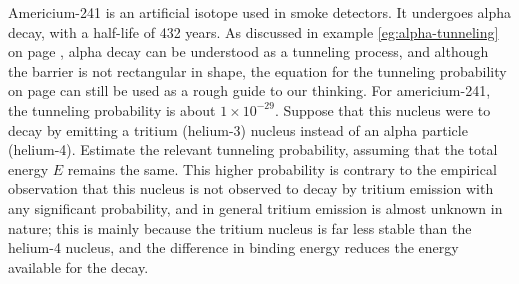 Americium-241 is an artificial isotope used in smoke detectors. It undergoes alpha decay, with a half-life of 432 years.
As discussed in example \ref{eg:alpha-tunneling} on page \pageref{eg:alpha-tunneling}, alpha decay can be understood
as a tunneling process, and although the barrier is not rectangular in shape, the equation for the tunneling
probability on page \pageref{tunneling-probability} can still be used as a rough guide to our thinking.
For americium-241, the tunneling probability is about $1\times10^{-29}$. %
Suppose that this nucleus were to decay by emitting a tritium (helium-3) nucleus instead of an alpha particle (helium-4).
Estimate the relevant tunneling probability, assuming that the total energy $E$ remains the same.
This higher probability is contrary to the empirical observation that this
nucleus is not observed to decay by tritium emission with any significant probability, and in general
tritium emission is almost unknown in nature; this is mainly because the tritium nucleus is far less stable
than the helium-4 nucleus, and the difference in binding energy reduces the energy available for the decay.
